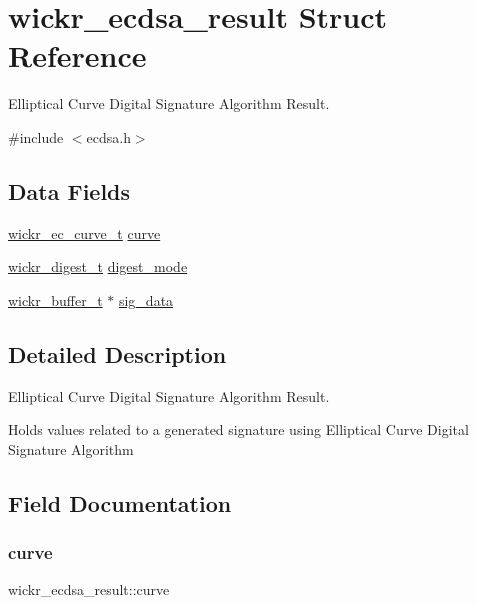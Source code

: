 \hypertarget{structwickr__ecdsa__result}{}\section{wickr\+\_\+ecdsa\+\_\+result Struct Reference}
\label{structwickr__ecdsa__result}


Elliptical Curve Digital Signature Algorithm Result.  




{\ttfamily \#include $<$ecdsa.\+h$>$}

\subsection*{Data Fields}
\begin{DoxyCompactItemize}
\item 
\hyperlink{structwickr__ec__curve}{wickr\+\_\+ec\+\_\+curve\+\_\+t} \hyperlink{structwickr__ecdsa__result_a76bcae0ea46e0f99bfd8fb70aac165bb}{curve}
\item 
\hyperlink{structwickr__digest}{wickr\+\_\+digest\+\_\+t} \hyperlink{structwickr__ecdsa__result_a33c820900693a016ac43702e76b54cff}{digest\+\_\+mode}
\item 
\hyperlink{structwickr__buffer}{wickr\+\_\+buffer\+\_\+t} $\ast$ \hyperlink{structwickr__ecdsa__result_ada32a17d9f713f84142fc6a338ebcc48}{sig\+\_\+data}
\end{DoxyCompactItemize}


\subsection{Detailed Description}
Elliptical Curve Digital Signature Algorithm Result. 

Holds values related to a generated signature using Elliptical Curve Digital Signature Algorithm 

\subsection{Field Documentation}
\mbox{\label{structwickr__ecdsa__result_a76bcae0ea46e0f99bfd8fb70aac165bb}} 
\subsubsection{\texorpdfstring{curve}{curve}}
{\footnotesize\ttfamily wickr\+\_\+ecdsa\+\_\+result\+::curve}

